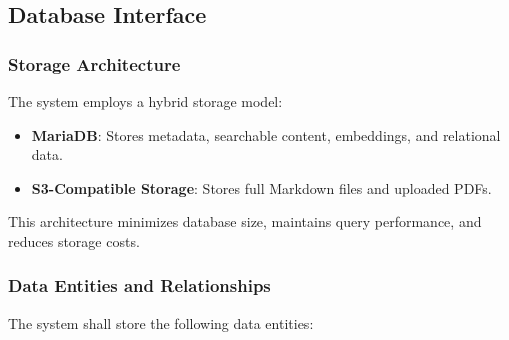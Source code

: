 \documentclass[12pt,a4paper]{article}
\begin{document}
\subsection{Database Interface}

\subsubsection{Storage Architecture}

The system employs a hybrid storage model:

\begin{itemize}
    \item \textbf{MariaDB}: Stores metadata, searchable content, embeddings, and relational data.
    \item \textbf{S3-Compatible Storage}: Stores full Markdown files and uploaded PDFs.
\end{itemize}

This architecture minimizes database size, maintains query performance, and reduces storage costs.

\subsubsection{Data Entities and Relationships}

The system shall store the following data entities:
\end{document}
